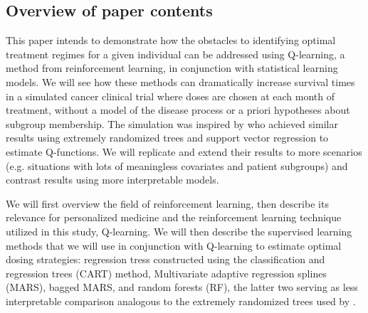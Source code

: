 \documentclass[12pt]{article}
\begin{document}

%
%
%




\subsection{Overview of paper contents} %
\label{sub:overview_of_contents}

This paper intends to demonstrate how the obstacles to identifying optimal treatment regimes for a given individual can be addressed using Q-learning, a method from reinforcement learning, in conjunction with statistical learning models. We will see how these methods can dramatically increase survival times in a simulated cancer clinical trial where doses are chosen at each month of treatment, without a model of the disease process or a priori hypotheses about subgroup membership. The simulation was inspired by \textcite{crt} who achieved similar results using extremely randomized trees and support vector regression to estimate Q-functions. We will replicate and extend their results to more scenarios (e.g. situations with lots of meaningless covariates and patient subgroups) and contrast results using more interpretable models.

We will first overview the field of reinforcement learning, then describe its relevance for personalized medicine and the reinforcement learning technique utilized in this study, Q-learning. We will then describe the supervised learning methods that we will use in conjunction with Q-learning to estimate optimal dosing strategies: regression tress constructed using the classification and regression trees (CART) method, Multivariate adaptive regression splines (MARS), bagged MARS, and random forests (RF), the latter two serving as less interpretable comparison analogous to the extremely randomized trees used by \textcite{crt}.
\end{document}

